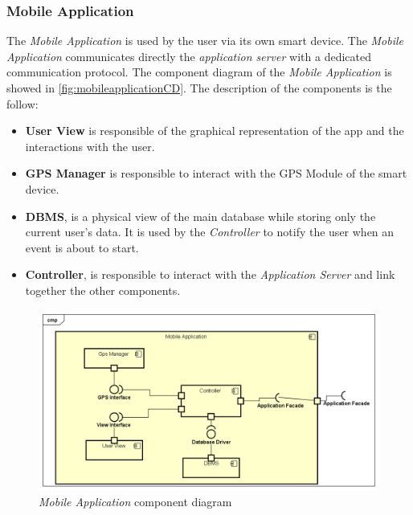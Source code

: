 \subsubsection{Mobile Application}
The \emph{Mobile Application} is used by the user via its own smart device. The \emph{Mobile Application} communicates directly the \emph{application server} with a dedicated communication protocol.
The component diagram of the \emph{Mobile Application} is showed in \autoref{fig:mobileapplicationCD}.
The description of the components is the follow:
\begin{itemize}
	\item \textbf{User View} is responsible of the graphical representation of the app and the interactions with the user.
	\item \textbf{GPS Manager} is responsible to interact with the GPS Module of the smart device.
	\item \textbf{DBMS}, is a physical view of the main database while storing only the current user's data.  It is used by the \emph{Controller} to notify the user when an event is about to start.
	\item \textbf{Controller}, is responsible to interact with the \emph{Application Server} and link together the other components.
\end{itemize}

\begin{figure}
	\includegraphics[width = \textwidth, keepaspectratio = true]{Img/MobileApplication}
	\caption{\emph{Mobile Application} component diagram}
	\label{fig:mobileapplicationCD}
\end{figure}

\clearpage

